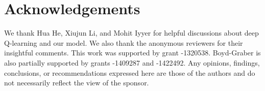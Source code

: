 \documentclass{article}
\begin{document}








\section*{Acknowledgements}
We thank Hua He, Xiujun Li, and Mohit Iyyer for helpful discussions about deep Q-learning and our model. 
We also thank the anonymous reviewers for their insightful comments.
This work was supported by  grant -1320538.
Boyd-Graber is also partially supported by  grants
-1409287 and -1422492. Any opinions, findings,
conclusions, or recommendations expressed here are those of the
authors and do not necessarily reflect the view of the sponsor.




\end{document}
